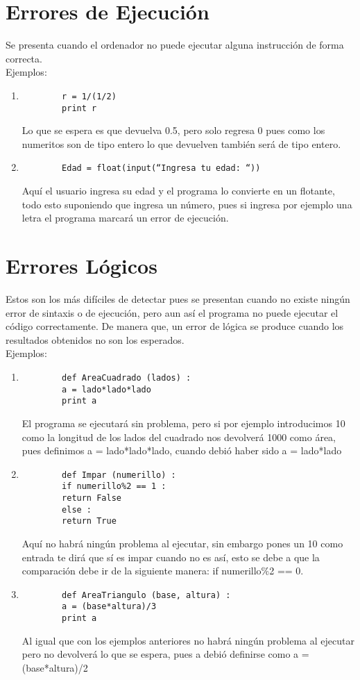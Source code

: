 \documentclass{book} %
\begin{document}
\section{Errores de Ejecución}
Se presenta cuando el ordenador no puede ejecutar alguna instrucción de forma correcta. \\Ejemplos: 
\begin{enumerate}
	\item \begin{verbatim}
		r = 1/(1/2)
		print r 
	\end{verbatim} Lo que se espera es que devuelva 0.5, pero solo regresa 0 pues como los numeritos son de tipo entero lo que devuelven también será de tipo entero. 
	\item \begin{verbatim}
		Edad = float(input(“Ingresa tu edad: “))
	\end{verbatim} Aquí el usuario ingresa su edad y el programa lo convierte en un flotante, todo esto suponiendo que ingresa un número, pues si ingresa por ejemplo una letra el programa marcará un error de ejecución.
\end{enumerate}
\section{Errores Lógicos}
Estos son los más difíciles de detectar pues se presentan cuando no existe ningún error de sintaxis o de ejecución, pero aun así el programa no puede ejecutar el código correctamente. De manera que, un error de lógica se produce cuando los resultados obtenidos no son los esperados.\\Ejemplos:
\begin{enumerate}
	\item \begin{verbatim}
		def AreaCuadrado (lados) :
		a = lado*lado*lado
		print a 
	\end{verbatim}
	El programa se ejecutará sin problema, pero si por ejemplo introducimos 10 como la longitud de los lados del cuadrado nos devolverá 1000 como área, pues definimos a = lado*lado*lado, cuando debió haber sido a = lado*lado
	\item \begin{verbatim}
		def Impar (numerillo) :
		if numerillo%2 == 1 :
		return False
		else :
		return True
	\end{verbatim}
	Aquí no habrá ningún problema al ejecutar, sin embargo pones un 10 como entrada te dirá que sí es impar cuando no es así, esto se debe a que la comparación debe ir de la siguiente manera: if numerillo$\%$2 == 0.
	\item \begin{verbatim}
		def AreaTriangulo (base, altura) :
		a = (base*altura)/3
		print a
	\end{verbatim}
	Al igual que con los ejemplos anteriores no habrá ningún problema al ejecutar pero no devolverá lo que se espera, pues a debió definirse como a = (base*altura)/2
\end{enumerate}
\end{document}
